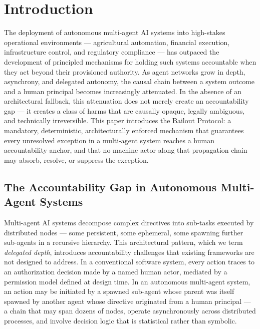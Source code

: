 \section{Introduction}\label{sec:introduction}

The deployment of autonomous multi-agent AI systems into high-stakes operational environments — agricultural automation, financial execution, infrastructure control, and regulatory compliance — has outpaced the development of principled mechanisms for holding such systems accountable when they act beyond their provisioned authority. As agent networks grow in depth, asynchrony, and delegated autonomy, the causal chain between a system outcome and a human principal becomes increasingly attenuated. In the absence of an architectural fallback, this attenuation does not merely create an accountability gap — it creates a class of harms that are causally opaque, legally ambiguous, and technically irreversible. This paper introduces the Bailout Protocol: a mandatory, deterministic, architecturally enforced mechanism that guarantees every unresolved exception in a multi-agent system reaches a human accountability anchor, and that no machine actor along that propagation chain may absorb, resolve, or suppress the exception.

\subsection{The Accountability Gap in Autonomous Multi-Agent Systems}\label{sec:accountability-gap}

Multi-agent AI systems decompose complex directives into sub-tasks executed by distributed nodes — some persistent, some ephemeral, some spawning further sub-agents in a recursive hierarchy. This architectural pattern, which we term \emph{delegated depth}, introduces accountability challenges that existing frameworks are not designed to address. In a conventional software system, every action traces to an authorization decision made by a named human actor, mediated by a permission model defined at design time. In an autonomous multi-agent system, an action may be initiated by a spawned sub-agent whose parent was itself spawned by another agent whose directive originated from a human principal — a chain that may span dozens of nodes, operate asynchronously across distributed processes, and involve decision logic that is statistical rather than symbolic.

